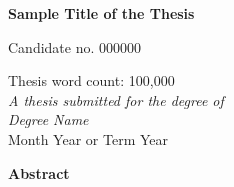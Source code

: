\thispagestyle{empty}
\begin{alwayssingle}
    \begin{center}

    {\Large\bfseries Sample Title of the Thesis \par}
    {\large \vspace*{2ex} Candidate no. 000000 \par}
    {\large
        \vspace*{1ex}
        {Thesis word count: 100,000} \\
        \vspace*{1ex}
        {\it A thesis submitted for the degree of} \\
        {\it Degree Name} \\
        \vspace*{2ex}
        Month Year or Term Year \par
    }

        \vfill
        {\Large \bfseries Abstract}
    \end{center}

    \vspace{1ex}

    \setlength{\baselineskip}{0pt}

    \noindent
    

    \vfill
\end{alwayssingle}
\restoregeometry

\setlength{\baselineskip}{\textbaselineskip}